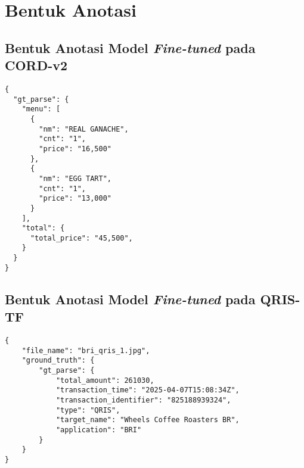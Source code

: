 \chapter{Bentuk Anotasi}
\label{chap:bentuk-anotasi}

\section{Bentuk Anotasi Model \donut{} \emph{Fine-tuned} pada \datasetfl{} CORD-v2}
\begin{lstlisting}[style=jsonstyle]
{
  "gt_parse": {
    "menu": [
      {
        "nm": "REAL GANACHE",
        "cnt": "1",
        "price": "16,500"
      },
      {
        "nm": "EGG TART",
        "cnt": "1",
        "price": "13,000"
      }
    ],
    "total": {
      "total_price": "45,500",
    }
  }
}
\end{lstlisting}

\section{Bentuk Anotasi Model \donut{} \emph{Fine-tuned} pada \datasetfl{} QRIS-TF}
\begin{lstlisting}[style=jsonstyle]
{
    "file_name": "bri_qris_1.jpg",
    "ground_truth": {
        "gt_parse": {
            "total_amount": 261030,
            "transaction_time": "2025-04-07T15:08:34Z",
            "transaction_identifier": "825188939324",
            "type": "QRIS",
            "target_name": "Wheels Coffee Roasters BR",
            "application": "BRI"
        }
    }
}
\end{lstlisting}